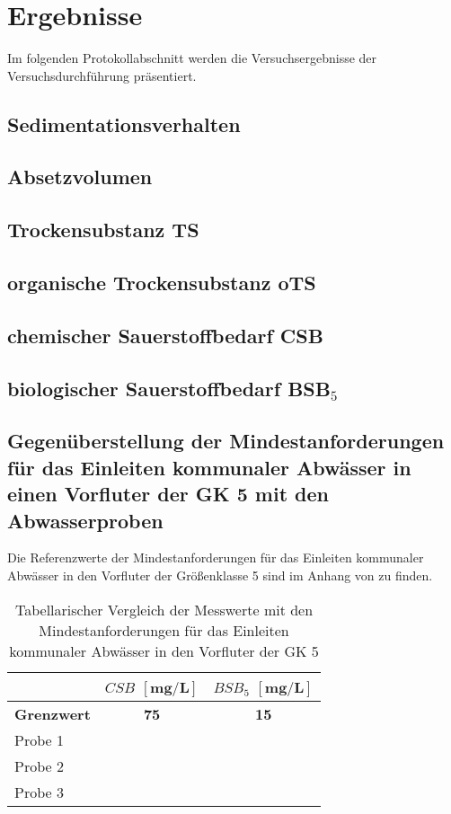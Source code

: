 \chapter{Ergebnisse}
\label{sec:ergebnisse}

Im folgenden Protokollabschnitt werden die Versuchsergebnisse der Versuchsdurchführung präsentiert.
\vspace*{-3.5mm}

\section{Sedimentationsverhalten}
\section{Absetzvolumen}
\section{Trockensubstanz TS}
\section{organische Trockensubstanz oTS}
\section{chemischer Sauerstoffbedarf CSB}
\section{biologischer Sauerstoffbedarf BSB$_5$}

\newpage

\section{Gegenüberstellung der Mindestanforderungen für das Einleiten kommunaler Abwässer in einen Vorfluter der GK 5 mit den Abwasserproben}
Die Referenzwerte der Mindestanforderungen für das Einleiten kommunaler Abwässer in den Vorfluter der Größenklasse 5 sind im Anhang von \cite[S. 29]{Skript} zu finden.
\vspace*{-2.5mm}
\renewcommand{\arraystretch}{1.2}
\begin{table}[h!]
	\centering
	\caption{Tabellarischer Vergleich der Messwerte mit den Mindestanforderungen für das Einleiten kommunaler Abwässer in den Vorfluter der GK 5}
	\label{tab_vgl}
	\begin{tabulary}{1.2\textwidth}{l|C|C}
		\hline
		 & \textbf{$CSB$} $\boldsymbol{\left[\si{\milli\gram\per\liter}\right]}$ & \textbf{$BSB_5$} $\boldsymbol{\left[\si{\milli\gram\per\liter}\right]}$\\
		\hline
		\textbf{Grenzwert} & \textbf{75} & \textbf{15}  \\
		\hline
		Probe 1 &  &  \\
		Probe 2 &  &  \\
		Probe 3 &  &  \\
		\hline
	\end{tabulary}
\end{table}
\FloatBarrier

